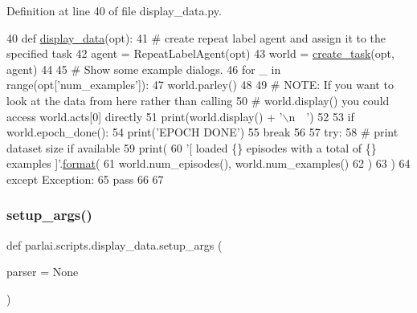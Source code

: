 Definition at line 40 of file display\+\_\+data.\+py.


\begin{DoxyCode}
40 \textcolor{keyword}{def }\hyperlink{namespaceparlai_1_1scripts_1_1display__data_af47c3f49de57cd1a9397b88bf36a8213}{display\_data}(opt):
41     \textcolor{comment}{# create repeat label agent and assign it to the specified task}
42     agent = RepeatLabelAgent(opt)
43     world = \hyperlink{namespaceparlai_1_1core_1_1worlds_a79969c7ba76d4b3c500f5bb776444dc6}{create\_task}(opt, agent)
44 
45     \textcolor{comment}{# Show some example dialogs.}
46     \textcolor{keywordflow}{for} \_ \textcolor{keywordflow}{in} range(opt[\textcolor{stringliteral}{'num\_examples'}]):
47         world.parley()
48 
49         \textcolor{comment}{# NOTE: If you want to look at the data from here rather than calling}
50         \textcolor{comment}{# world.display() you could access world.acts[0] directly}
51         print(world.display() + \textcolor{stringliteral}{'\(\backslash\)n~~'})
52 
53         \textcolor{keywordflow}{if} world.epoch\_done():
54             print(\textcolor{stringliteral}{'EPOCH DONE'})
55             \textcolor{keywordflow}{break}
56 
57     \textcolor{keywordflow}{try}:
58         \textcolor{comment}{# print dataset size if available}
59         print(
60             \textcolor{stringliteral}{'[ loaded \{\} episodes with a total of \{\} examples ]'}.\hyperlink{namespaceparlai_1_1chat__service_1_1services_1_1messenger_1_1shared__utils_a32e2e2022b824fbaf80c747160b52a76}{format}(
61                 world.num\_episodes(), world.num\_examples()
62             )
63         )
64     \textcolor{keywordflow}{except} Exception:
65         \textcolor{keywordflow}{pass}
66 
67 
\end{DoxyCode}
\mbox{\label{namespaceparlai_1_1scripts_1_1display__data_a666e6177939b9a63961e56a1dfdc74b4}} 
\subsubsection{\texorpdfstring{setup\+\_\+args()}{setup\_args()}}
{\footnotesize\ttfamily def parlai.\+scripts.\+display\+\_\+data.\+setup\+\_\+args (\begin{DoxyParamCaption}\item[{}]{parser = {\ttfamily None} }\end{DoxyParamCaption})}




